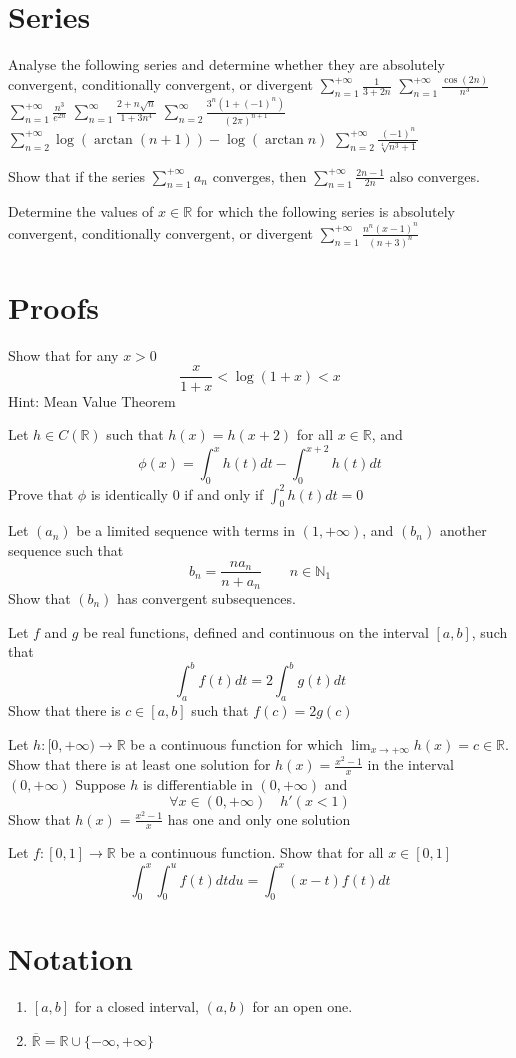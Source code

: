 \documentclass[12pt]{article}
\begin{document}
\section{Series}
\begin{ExerciseList}
	\Exercise Analyse the following series and determine whether they are absolutely convergent, conditionally convergent, or divergent
	\Question $\sum_{n=1}^{+\infty}\frac{1}{3+2n}$
	\Question $\sum_{n=1}^{+\infty}\frac{\cos(2n)}{n^3}$
	\Question $\sum_{n=1}^{+\infty}\frac{n^3}{e^{2n}}$
	\Question $\sum_{n=1}^{\infty}\frac{2+n\sqrt{n}}{1+3n^4}$
	\Question $\sum_{n=2}^{\infty}\frac{3^n(1+(-1)^n)}{(2\pi)^{n+1}}$
	\Question $\sum_{n=2}^{+\infty} \log(\arctan(n+1))-\log(\arctan n)$
	\Question $\sum_{n=2}^{+\infty} \frac{(-1)^n}{\sqrt[4]{n^3 + 1}}$

	\Exercise Show that if the series $\sum_{n=1}^{+\infty}a_n$ converges, then
	$\sum_{n=1}^{+\infty}\frac{2n-1}{2n}$ also converges.

	\Exercise Determine the values of $x\in\mathbb R$ for which the following series
	is absolutely convergent, conditionally convergent, or divergent
	\Question $\sum_{n=1}^{+\infty}\frac{n^n(x-1)^n}{(n+3)^n}$
\end{ExerciseList}

\section{Proofs}
\begin{ExerciseList}
	\Exercise Show that for any $x>0$
	$$\frac{x}{1+x} < \log(1+x) < x$$
	Hint: Mean Value Theorem

	\Exercise Let $h\in C(\mathbb R)$ such that $h(x) = h(x+2)$ for all $x\in\mathbb R$, and
	$$\phi(x) = \int_0^x{h(t)dt}-\int_0^{x+2}{h(t)dt}$$
	Prove that $\phi$ is identically $0$ if and only if $\int_0^2 h(t)dt = 0$

	\Exercise Let $(a_n)$ be a limited sequence with terms in $(1,+\infty)$, and
	$(b_n)$ another sequence such that $$b_n = \frac{na_n}{n+a_n}\qquad n\in\mathbb N_1$$
	Show that $(b_n)$ has convergent subsequences.

	\Exercise Let $f$ and $g$ be real functions, defined and continuous on the interval $[a,b]$, such that
	$$\int_a^b{f(t)}dt = 2\int_a^b{g(t)}dt$$
	Show that there is $c\in[a,b]$ such that $f(c)=2g(c)$

	\Exercise Let $h\colon [0,+\infty)\to\mathbb R$ be a continuous function
	for which $\lim_{x\to +\infty}h(x)=c\in\mathbb R$.
	\Question Show that there is at least one solution for $h(x)=\frac{x^2-1}{x}$
	in the interval $(0,+\infty)$
	\Question Suppose $h$ is differentiable in $(0,+\infty)$ and
	$$\forall x\in(0,+\infty)\quad h'(x<1)$$
	Show that $h(x)=\frac{x^2-1}{x}$ has one and only one solution

	\Exercise Let $f\colon [0,1]\to\mathbb R$ be a continuous function. Show that
	for all $x\in[0,1]$
	$$\int_0^x{\int_0^u{f(t)}dt}du=\int_0^x{(x-t)f(t)}dt$$

\end{ExerciseList}
\section{Notation}
\begin{enumerate}
	\item  $[a,b]$ for a closed interval, $(a,b)$ for an open one.
	\item $\overline{\mathbb R} = \mathbb R \cup \{-\infty, +\infty\}$
\end{enumerate}
\end{document}
